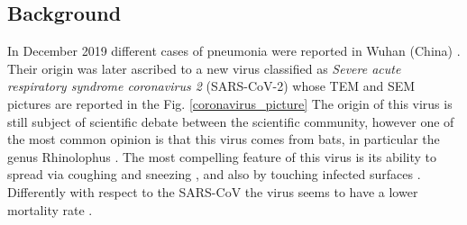 \documentclass[
12pt, %
a4paper, %
oneside, %
headinclude,footinclude, %
BCOR5mm, %
]{scrartcl}
\begin{document}
\subsection{Background} \label{Background}
In December 2019 different cases of pneumonia were reported in Wuhan (China) \cite{huang2020clinical}. Their origin was later ascribed to a new virus classified as \textit{Severe acute respiratory syndrome coronavirus 2} (SARS-CoV-2) whose TEM and SEM pictures are reported in the Fig. \ref{coronavirus_picture} The origin of this virus is still subject of scientific debate between the scientific community, however one of the most common opinion is that this virus comes from bats, in particular the genus Rhinolophus \cite{zhou2020pneumonia}. The most compelling feature of this virus is its ability to spread via coughing and sneezing \cite{ghinai2020first}, and also by touching infected surfaces \cite{chang2020protecting}. Differently with respect to the SARS-CoV the virus seems to have a lower mortality rate \cite{sorensen2006severe,weiss2020clinical}.
\end{document}
